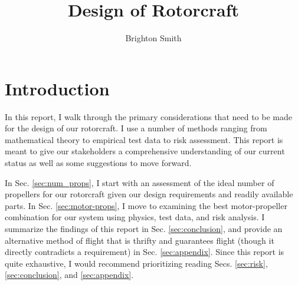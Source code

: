 \documentclass{article}
\title{Design of Rotorcraft}
\author{Brighton Smith}
\begin{document}
\maketitle

\section{Introduction}
In this report, I walk through the primary considerations that need to be made for the design of our rotorcraft. I use a number of methods ranging from mathematical theory to empirical test data to risk assessment. This report is meant to give our stakeholders a comprehensive understanding of our current status as well as some suggestions to move forward. 

In Sec. \ref{sec:num_props}, I start with an assessment of the ideal number of propellers for our rotorcraft given our design requirements and readily available parts. In Sec. \ref{sec:motor-props}, I move to examining the best motor-propeller combination for our system using physics, test data, and risk analysis. I summarize the findings of this report in Sec. \ref{sec:conclusion}, and provide an alternative method of flight that is thrifty and guarantees flight (though it directly contradicts a requirement) in Sec. \ref{sec:appendix}. Since this report is quite exhaustive, I would recommend prioritizing reading Secs. \ref{sec:risk}, \ref{sec:conclusion}, and \ref{sec:appendix}. 
\end{document}
